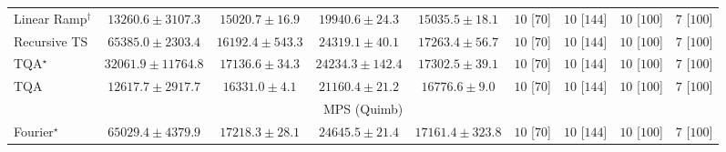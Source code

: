 \begin{tabular}{l|cccc|cccc|}
Linear Ramp$^\dagger$ & {\cellcolor[HTML]{D4E3EF}} \color[HTML]{000000} $13260.6\pm 3107.3$ & {\cellcolor[HTML]{CFDFED}} \color[HTML]{000000} $15020.7\pm 16.9$ & {\cellcolor[HTML]{BFD3E6}} \color[HTML]{000000} $19940.6\pm 24.3$ & {\cellcolor[HTML]{CFDFED}} \color[HTML]{000000} $15035.5\pm 18.1$ & {\cellcolor[HTML]{49006A}} \color[HTML]{F1F1F1} $10$ [$70$] & {\cellcolor[HTML]{49006A}} \color[HTML]{F1F1F1} $10$ [$144$] & {\cellcolor[HTML]{49006A}} \color[HTML]{F1F1F1} $10$ [$100$] & {\cellcolor[HTML]{FFF7F3}} \color[HTML]{000000} $7$ [$100$] \\
Recursive TS & {\cellcolor[HTML]{852A8E}} \color[HTML]{F1F1F1} $65385.0\pm 2303.4$ & {\cellcolor[HTML]{CBDCEB}} \color[HTML]{000000} $16192.4\pm 543.3$ & {\cellcolor[HTML]{B1C9E1}} \color[HTML]{000000} $24319.1\pm 40.1$ & {\cellcolor[HTML]{C8DAEA}} \color[HTML]{000000} $17263.4\pm 56.7$ & {\cellcolor[HTML]{49006A}} \color[HTML]{F1F1F1} $10$ [$70$] & {\cellcolor[HTML]{49006A}} \color[HTML]{F1F1F1} $10$ [$144$] & {\cellcolor[HTML]{49006A}} \color[HTML]{F1F1F1} $10$ [$100$] & {\cellcolor[HTML]{FFF7F3}} \color[HTML]{000000} $7$ [$100$] \\
TQA$^\star$ & {\cellcolor[HTML]{9BB6D7}} \color[HTML]{000000} $32061.9\pm 11764.8$ & {\cellcolor[HTML]{C8DAEA}} \color[HTML]{000000} $17136.6\pm 34.3$ & {\cellcolor[HTML]{B1C9E1}} \color[HTML]{000000} $24234.3\pm 142.4$ & {\cellcolor[HTML]{C8DAEA}} \color[HTML]{000000} $17302.5\pm 39.1$ & {\cellcolor[HTML]{49006A}} \color[HTML]{F1F1F1} $10$ [$70$] & {\cellcolor[HTML]{49006A}} \color[HTML]{F1F1F1} $10$ [$144$] & {\cellcolor[HTML]{49006A}} \color[HTML]{F1F1F1} $10$ [$100$] & {\cellcolor[HTML]{FFF7F3}} \color[HTML]{000000} $7$ [$100$] \\
TQA & {\cellcolor[HTML]{D7E5F0}} \color[HTML]{000000} $12617.7\pm 2917.7$ & {\cellcolor[HTML]{CBDCEB}} \color[HTML]{000000} $16331.0\pm 4.1$ & {\cellcolor[HTML]{BCD1E5}} \color[HTML]{000000} $21160.4\pm 21.2$ & {\cellcolor[HTML]{C9DBEA}} \color[HTML]{000000} $16776.6\pm 9.0$ & {\cellcolor[HTML]{49006A}} \color[HTML]{F1F1F1} $10$ [$70$] & {\cellcolor[HTML]{49006A}} \color[HTML]{F1F1F1} $10$ [$144$] & {\cellcolor[HTML]{49006A}} \color[HTML]{F1F1F1} $10$ [$100$] & {\cellcolor[HTML]{FFF7F3}} \color[HTML]{000000} $7$ [$100$] \\
\cline{1-9}
\multicolumn{9}{c}{\rule{0pt}{8pt}MPS (Quimb)} \\
\midrule
Fourier$^\star$ & {\cellcolor[HTML]{B64203}} \color[HTML]{F1F1F1} $65029.4\pm 4379.9$ & {\cellcolor[HTML]{FEE89D}} \color[HTML]{000000} $17218.3\pm 28.1$ & {\cellcolor[HTML]{FED573}} \color[HTML]{000000} $24645.5\pm 21.4$ & {\cellcolor[HTML]{FEE89D}} \color[HTML]{000000} $17161.4\pm 323.8$ & {\cellcolor[HTML]{49006A}} \color[HTML]{F1F1F1} $10$ [$70$] & {\cellcolor[HTML]{49006A}} \color[HTML]{F1F1F1} $10$ [$144$] & {\cellcolor[HTML]{49006A}} \color[HTML]{F1F1F1} $10$ [$100$] & {\cellcolor[HTML]{FFF7F3}} \color[HTML]{000000} $7$ [$100$] \\

\end{tabular}
